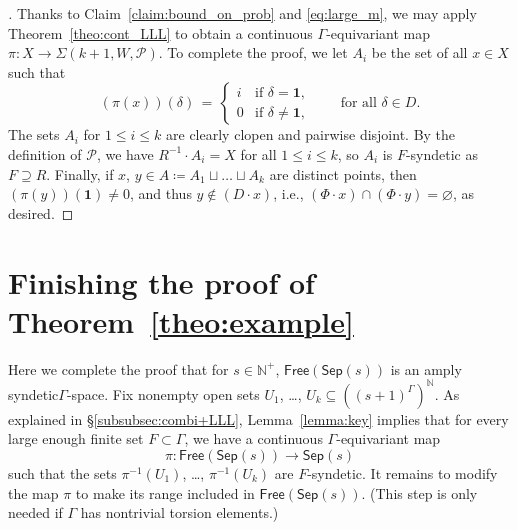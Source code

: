 \documentclass[11pt,reqno,psamsfonts]{amsart}
\theoremstyle{bfnote}
\theoremstyle{definition}
\theoremstyle{remark}
\newcommand{\0}{\varnothing}
\renewcommand{\leq}{\leqslant}
\newcommand{\defeq}{\coloneqq}
\newcommand{\G}{\Gamma}
\newcommand{\Free}{\mathsf{Free}}
\newcommand{\N}{\mathbb{N}}
\newcommand{\iden}{\mathbf{1}}
\newcommand{\sr}{amply syndetic\xspace}
\newcommand{\Sep}{\mathsf{Sep}}
\numberwithin{equation}{section}
\newenvironment{scproof}[1][]{\begin{proof}[\textsc{\upshape{Proof}}#1]}{\end{proof}}
\begin{document}
\begin{scproof}
        Thanks to Claim~\ref{claim:bound_on_prob} and \eqref{eq:large_m}, we may apply Theorem~\ref{theo:cont_LLL} to obtain a continuous $\G$-equivariant map $\pi \colon X \to \Sigma(k+1, W, \mathcal{P})$. To complete the proof, we let $A_i$ be the set of all $x \in X$ such that
        \[
            (\pi(x))(\delta) \,=\, \begin{cases}
                i &\text{if } \delta = \iden,\\
                0 &\text{if } \delta \neq \iden,
            \end{cases} \qquad \text{for all }\delta \in D.
        \]
        The sets $A_i$ for $1 \leq i \leq k$ are clearly clopen and pairwise disjoint. By the definition of $\mathcal{P}$, we have $R^{-1} \cdot A_i = X$ for all $1 \leq i \leq k$, so $A_i$ is $F$-syndetic as $F \supseteq R$. Finally, if $x$, $y \in A \defeq A_1 \sqcup \ldots \sqcup A_k$ are distinct points, then $(\pi(y))(\iden) \neq 0$, and thus $y \notin (D \cdot x)$, i.e., $(\Phi \cdot x) \cap (\Phi \cdot y) = \0$, as desired.
    \end{scproof}

    \section{Finishing the proof of Theorem~\ref{theo:example}}\label{sec:final}

    Here we complete the proof that for $s \in \N^+$, $\Free(\Sep(s))$ is an \sr $\G$-space. Fix nonempty open sets $U_1$, \ldots, $U_k \subseteq ((s+1)^\G)^\N$. %
        As explained in \S\ref{subsubsec:combi+LLL}, Lemma~\ref{lemma:key} implies that for every large enough finite set $F \subset \G$, %
        we have %
        a continuous $\G$-equivariant map 
        \[
            \pi \colon \Free(\Sep(s)) \to \Sep(s)
        \]
        such that the sets $\pi^{-1}(U_1)$, \ldots, $\pi^{-1}(U_k)$ are $F$-syndetic. It remains to modify the map $\pi$ to make its range included in $\Free(\Sep(s))$. (This step is only needed if $\G$ has nontrivial torsion elements.) 
        
\end{document}

